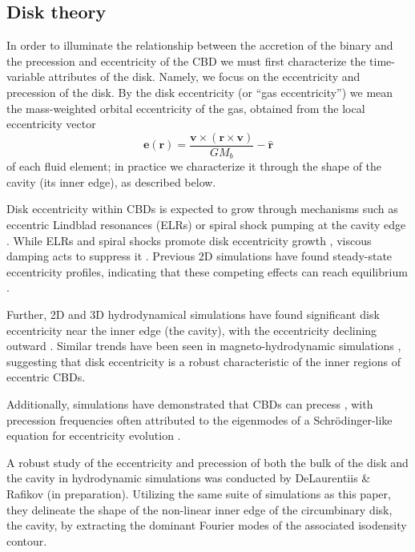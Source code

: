 \documentclass[fleqn,usenatbib]{mnras}
\begin{document}
\subsection{Disk theory}

In order to illuminate the relationship between the accretion of the binary and the precession and eccentricity of the CBD we must first characterize the time-variable attributes of the disk. Namely, we focus on the eccentricity and precession of the disk. By the disk eccentricity (or ``gas eccentricity'') we mean the mass-weighted orbital eccentricity of the gas, obtained from the local eccentricity vector
\begin{equation}\label{eqn:ecc_vector}
    \mathbf{e}(\mathbf{r}) = \frac{\mathbf{v}\times(\mathbf{r}\times\mathbf{v})}{GM_b} - \hat{\mathbf{r}}
\end{equation}
of each fluid element; in practice we characterize it through the shape of the cavity (its inner edge), as described below.

Disk eccentricity within CBDs is expected to grow through mechanisms such as eccentric Lindblad resonances (ELRs) or spiral shock pumping at the cavity edge \citep{lubow_91, whitehurst_94, paardekooper_2008, kley_2008, shi_2012}. While ELRs and spiral shocks promote disk eccentricity growth \citep{lubow_91, shi_2012}, viscous damping acts to suppress it \citep{Goodchild_2006}. Previous 2D simulations have found steady-state eccentricity profiles, indicating that these competing effects can reach equilibrium \citep{miranda_munoz_lai_2017, siwek_prefacc}.

Further, 2D and 3D hydrodynamical simulations have found significant disk eccentricity near the inner edge (the cavity), with the eccentricity declining outward \citep{MacFadyen_08, miranda_munoz_lai_2017, siwek_prefacc, ragusa_lynch}. Similar trends have been seen in magneto-hydrodynamic simulations \citep{shi_2012}, suggesting that disk eccentricity is a robust characteristic of the inner regions of eccentric CBDs.

Additionally, simulations have demonstrated that CBDs can precess \citep{nelson_2003, shi_2012, miranda_munoz_lai_2017, Thun_2017, siwek_prefacc}, with precession frequencies often attributed to the eigenmodes of a Schrödinger-like equation for eccentricity evolution \citep{Goodchild_2006, shi_2012, Teyssandier_2016, Lee_2019, munoz_lithwick_2020, Lubow_2022}.


A robust study of the eccentricity and precession of both the bulk of the disk and the cavity in hydrodynamic simulations was conducted by DeLaurentiis \& Rafikov (in preparation). Utilizing the same suite of simulations as this paper, they delineate the shape of the non-linear inner edge of the circumbinary disk, the cavity, by extracting the dominant Fourier modes of the associated isodensity contour.
\end{document}
